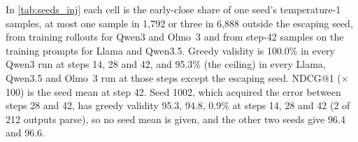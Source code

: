 In \cref{tab:seeds_inj} each cell is the early-close share of one seed's temperature-1 samples, at most one sample in 1,792 or three in 6,888 outside the escaping seed, from training rollouts for Qwen3 and Olmo~3 and from step-42 samples on the training prompts for Llama and Qwen3.5. Greedy validity is 100.0\% in every Qwen3 run at steps 14, 28 and 42, and 95.3\% (the ceiling) in every Llama, Qwen3.5 and Olmo~3 run at those steps except the escaping seed. NDCG@1 ($\times$100) is the seed mean at step 42. Seed 1002, which acquired the error between steps 28 and 42, has greedy validity 95.3, 94.8, 0.9\% at steps 14, 28 and 42 (2 of 212 outputs parse), so no seed mean is given, and the other two seeds give 96.4 and 96.6.
